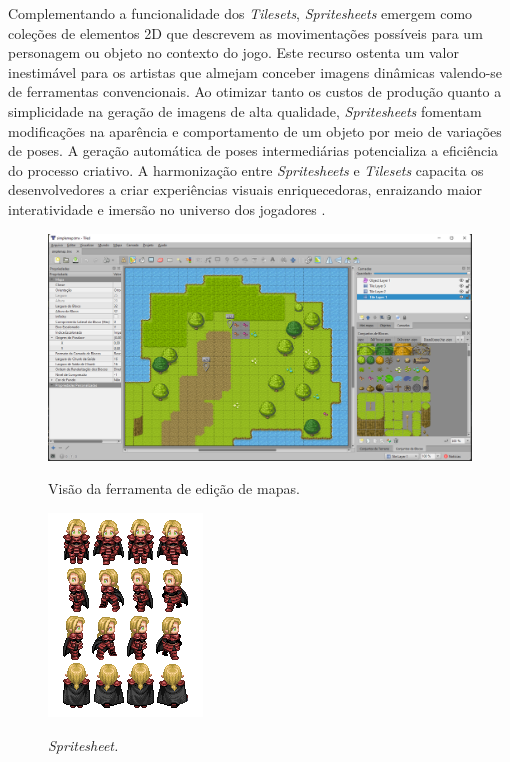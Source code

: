         Complementando a funcionalidade dos \textit{Tilesets}, \textit{Spritesheets} emergem como coleções de elementos 2D que descrevem as movimentações possíveis para um personagem ou objeto no contexto do jogo. Este recurso ostenta um valor inestimável para os artistas que almejam conceber imagens dinâmicas valendo-se de ferramentas convencionais. Ao otimizar tanto os custos de produção quanto a simplicidade na geração de imagens de alta qualidade, \textit{Spritesheets} fomentam modificações na aparência e comportamento de um objeto por meio de variações de poses. A geração automática de poses intermediárias potencializa a eficiência do processo criativo. A harmonização entre \textit{Spritesheets} e \textit{Tilesets} capacita os desenvolvedores a criar experiências visuais enriquecedoras, enraizando maior interatividade e imersão no universo dos jogadores \cite{jones2013dynamic}.

        \begin{figure}[h]
            \centering
            \caption{Visão da ferramenta de edição de mapas.}
            \includegraphics[scale=0.3]{Textuais/Pictures/Picture4.png}
            \label{fig:figure-4}
        \end{figure}

        \begin{figure}[h]
            \centering
            \caption{\textit{Spritesheet.}}
            \includegraphics[scale=1.8]{Textuais/Pictures/Picture5.png}
            \label{fig:figure-5}
        \end{figure}



